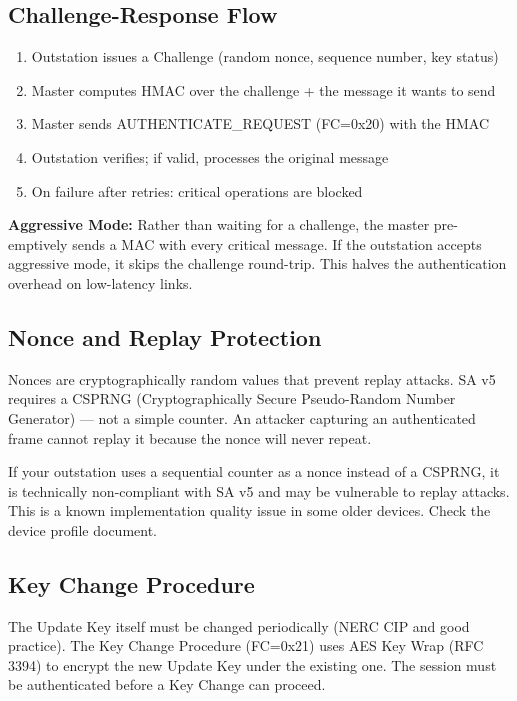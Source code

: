 \documentclass[11pt,twoside]{article}
\begin{document}
\subsection{Challenge-Response Flow}

\begin{enumerate}[noitemsep]
  \item Outstation issues a Challenge (random nonce, sequence number, key status)
  \item Master computes HMAC over the challenge + the message it wants to send
  \item Master sends AUTHENTICATE\_REQUEST (FC=0x20) with the HMAC
  \item Outstation verifies; if valid, processes the original message
  \item On failure after retries: critical operations are blocked
\end{enumerate}

\textbf{Aggressive Mode:} Rather than waiting for a challenge, the master pre-emptively sends a MAC with every critical message. If the outstation accepts aggressive mode, it skips the challenge round-trip. This halves the authentication overhead on low-latency links.

\subsection{Nonce and Replay Protection}

Nonces are cryptographically random values that prevent replay attacks. SA v5 requires a CSPRNG (Cryptographically Secure Pseudo-Random Number Generator) --- not a simple counter. An attacker capturing an authenticated frame cannot replay it because the nonce will never repeat.

\begin{warnbox}
If your outstation uses a sequential counter as a nonce instead of a CSPRNG, it is technically non-compliant with SA v5 and may be vulnerable to replay attacks. This is a known implementation quality issue in some older devices. Check the device profile document.
\end{warnbox}

\subsection{Key Change Procedure}

The Update Key itself must be changed periodically (NERC CIP and good practice). The Key Change Procedure (FC=0x21) uses AES Key Wrap (RFC 3394) to encrypt the new Update Key under the existing one. The session must be authenticated before a Key Change can proceed.
\end{document}
